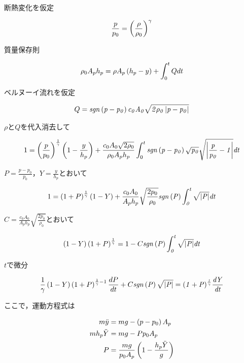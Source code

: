 \documentclass{jsarticle}
\begin{document}
断熱変化を仮定

\begin{align}
  \frac{p}{p_0} = \left({\frac{\rho}{\rho_0}}\right)^{\gamma}
\end{align}

質量保存則

\begin{align}
  \rho_0 A_p h_p = \rho A_p \left({h_p - y}\right) + \int_0^t Q dt
\end{align}

ベルヌーイ流れを仮定

\begin{align}
  Q = \it{sgn} \left({p - p_0}\right) c_0 A_0 \sqrt{2 \rho_0 \left|{p - p_0}\right|}
\end{align}

$\rho$と$Q$を代入消去して

\begin{align}
  1 = \left({\frac{p}{p_0}}\right)^{\frac{1}{\gamma}} \left({1 - \frac{y}{h_p}}\right) + \frac{c_0 A_0 \sqrt{2 \rho_0}}{\rho_0 A_p h_p} \int_0^t \it{sgn} \left({p - p_0}\right) \sqrt{p_0} \sqrt{\left|{\frac{p}{p_0} - 1}\right|} dt
\end{align}

$P = \frac{p - p_0}{p_0}$，$Y = \frac{y}{h_p}$とおいて

\begin{align}
  1 = \left({1 + P}\right)^{\frac{1}{\gamma}} \left({1 - Y}\right) + \frac{c_0 A_0}{A_p h_p} \sqrt{\frac{2 p_0}{\rho_0}} \it{sgn} \left({P}\right) \int_0^t \sqrt{\left|{P}\right|} dt
\end{align}

$C = \frac{c_0 A_0}{A_p h_p} \sqrt{\frac{2 p_0}{\rho_0}}$とおいて

\begin{align}
  \left({1 - Y}\right) \left({1 + P}\right)^{\frac{1}{\gamma}} = 1 - C \it{sgn} \left({P}\right) \int_0^t \sqrt{\left|{P}\right|} dt
\end{align}

$t$で微分

\begin{align}
  \frac{1}{\gamma} \left({1 - Y}\right) \left({1 + P}\right)^{\frac{1}{\gamma} - 1} \frac{dP}{dt} + C \it{sgn} \left({P}\right) \sqrt{\left|{P}\right|} = (1 + P)^\frac{1}{\gamma} \frac{dY}{dt}
\end{align}

ここで，運動方程式は

\begin{align}
  m \ddot{y} &= m g - \left({p - p_0}\right) A_p \\
  m h_p \ddot{Y} &= m g - P p_0 A_p \\
  P &= \frac{mg}{p_0 A_p} \left({1 - \frac{h_p \ddot{Y}}{g}}\right) \\
\end{align}
\end{document}
